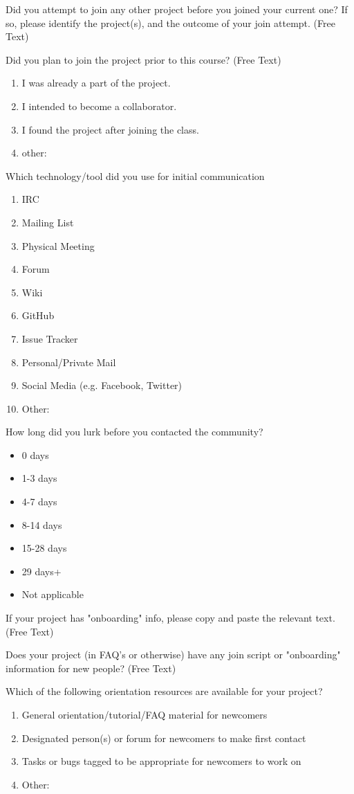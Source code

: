 \begin{table}
 Did you attempt to join any other project before you joined your current one? If so, please identify the project(s), and the outcome of your join attempt. (Free Text)

 Did you plan to join the project prior to this course? (Free Text)

\begin{enumerate}
\item  I was already a part of the project.
\item I intended to become a collaborator.
\item I found the project after joining the class.
\item other:
\end{enumerate}
 
Which technology/tool did you use for initial communication
\begin{enumerate}
\item IRC
\item Mailing List
\item Physical Meeting
\item Forum
\item Wiki
\item GitHub
\item Issue Tracker
\item Personal/Private Mail
\item Social Media (e.g. Facebook, Twitter)
\item Other:
\end{enumerate}

How long did you lurk before you contacted the community?
\begin{itemize}
\item 0 days
\item 1-3 days
\item 4-7 days
\item 8-14 days
\item 15-28 days
\item 29 days+
\item Not applicable 
\end{itemize}

If your project has "onboarding" info, please copy and paste the relevant text. (Free Text)

Does your project (in FAQ's or otherwise) have any join script or "onboarding" information for new people? (Free Text)

Which of the following orientation resources are available for your project?
\begin{enumerate}
\item General orientation/tutorial/FAQ material for newcomers
\item Designated person(s) or forum for newcomers to make first contact
\item Tasks or bugs tagged to be appropriate for newcomers to work on
\item Other:
\end{enumerate}


\end{table}
